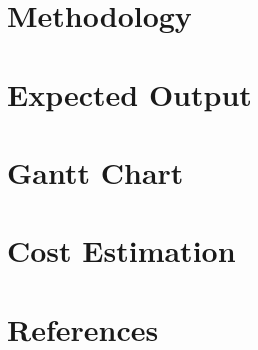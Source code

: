 \documentclass[12pt,a4paper]{report}
\begin{document}
\chapter{Methodology}
\label{methodology}


\chapter{Expected Output}
\label{result}


\chapter*{Gantt Chart}
\label{ganttchart}


\chapter*{Cost Estimation}
\label{cost estimation}



\chapter*{References}
\label{references}

\end{document}
